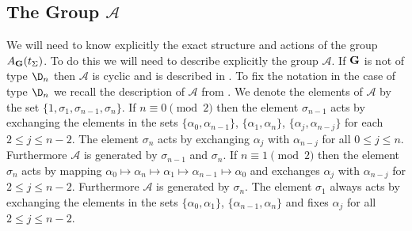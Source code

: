 \documentclass[eqthmnum]{jt-calcs}
\begin{document}
\subsection{\texorpdfstring{The Group $\mathcal{A}$}{The Group A}}
\begin{pa}
We will need to know explicitly the exact structure and actions of the group $A_{\mathbf{G}}(t_{\Sigma})$. To do this we will need to describe explicitly the group $\mathcal{A}$. If $\mathbf{G}$ is not of type $\D_n$ then $\mathcal{A}$ is cyclic and is described in \cite[Plates I-IX(XII)]{bourbaki:2002:lie-groups-chap-4-6}. To fix the notation in the case of type $\D_n$ we recall the description of $\mathcal{A}$ from \cite[Plate IV(XII)]{bourbaki:2002:lie-groups-chap-4-6}. We denote the elements of $\mathcal{A}$ by the set $\{1,\sigma_1,\sigma_{n-1},\sigma_n\}$. If $n \equiv 0 \pmod{2}$ then the element $\sigma_{n-1}$ acts by exchanging the elements in the sets $\{\alpha_0,\alpha_{n-1}\}$, $\{\alpha_1,\alpha_n\}$, $\{\alpha_j,\alpha_{n-j}\}$ for each $2 \leqslant j \leqslant n-2$. The element $\sigma_n$ acts by exchanging $\alpha_j$ with $\alpha_{n-j}$ for all $0 \leqslant j \leqslant n$. Furthermore $\mathcal{A}$ is generated by $\sigma_{n-1}$ and $\sigma_n$. If $n \equiv 1 \pmod{2}$ then the element $\sigma_n$ acts by mapping $\alpha_0 \mapsto \alpha_n \mapsto \alpha_1 \mapsto \alpha_{n-1} \mapsto \alpha_0$ and exchanges $\alpha_j$ with $\alpha_{n-j}$ for $2 \leqslant j \leqslant n-2$. Furthermore $\mathcal{A}$ is generated by $\sigma_n$. The element $\sigma_1$ always acts by exchanging the elements in the sets $\{\alpha_0,\alpha_1\}$, $\{\alpha_{n-1},\alpha_n\}$ and fixes $\alpha_j$ for all $2 \leqslant j \leqslant n-2$.
\end{pa}
\end{document}
